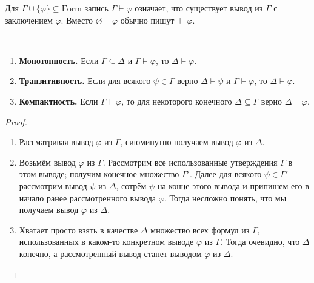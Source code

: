 \documentclass[12pt,a4paper]{article}
\newcommand{\Formul}{\ensuremath{\mathrm{Form}}\xspace}
\begin{document}
\begin{definition}
        Для $\Gamma \cup \{\varphi\} \subseteq \Formul$ запись $\Gamma \vdash \varphi$ означает, что существует вывод из $\Gamma$ с заключением $\varphi$. Вместо $\varnothing \vdash \varphi$ обычно пишут $\vdash \varphi$.
    \end{definition}

    \begin{lemma}\ 
        \begin{enumerate}
            \item {\bf Монотонность.} Если $\Gamma \subseteq \Delta$ и $\Gamma \vdash \varphi$, то $\Delta \vdash \varphi$.
            \item {\bf Транзитивность.} Если для всякого $\psi \in \Gamma$ верно $\Delta \vdash \psi$ и $\Gamma \vdash \varphi$, то $\Delta \vdash \varphi$.
            \item {\bf Компактность.} Если $\Gamma \vdash \varphi$, то для некоторого конечного $\Delta \subseteq \Gamma$ верно $\Delta \vdash \varphi$.
        \end{enumerate}
    \end{lemma}

    \begin{proof}\ 
        \begin{enumerate}
            \item Рассматривая вывод $\varphi$ из $\Gamma$, сиюминутно получаем вывод $\varphi$ из $\Delta$.
            \item Возьмём вывод $\varphi$ из $\Gamma$. Рассмотрим все использованные утверждения $\Gamma$ в этом выводе; получим конечное множество $\Gamma'$. Далее для всякого $\psi \in \Gamma'$ рассмотрим вывод $\psi$ из $\Delta$, сотрём $\psi$ на конце этого вывода и припишем его в начало ранее рассмотренного вывода $\varphi$. Тогда несложно понять, что мы получаем вывод $\varphi$ из $\Delta$.
            \item Хватает просто взять в качестве $\Delta$ множество всех формул из $\Gamma$, использованных в каком-то конкретном выводе $\varphi$ из $\Gamma$. Тогда очевидно, что $\Delta$ конечно, а рассмотренный вывод станет выводом $\varphi$ из $\Delta$.
        \end{enumerate}
    \end{proof}
\end{document}
